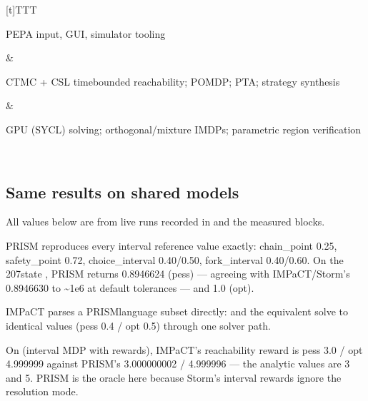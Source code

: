 \documentclass[a4paper,10pt,english]{sphinxmanual}
\begin{document}
\begin{savenotes}
\begin{tabulary}{\linewidth}[t]{TTT}
\\
\sphinxhline\begin{varwidth}[t]{}
\sphinxAtStartPar
PEPA input, GUI, simulator tooling
\sphinxbeforeendvarwidth
\end{varwidth}%
&\begin{varwidth}[t]{}
\sphinxAtStartPar
CTMC + CSL time\sphinxhyphen{}bounded reachability; POMDP; PTA; strategy synthesis
\sphinxbeforeendvarwidth
\end{varwidth}%
&\begin{varwidth}[t]{}
\sphinxAtStartPar
GPU (SYCL) solving; orthogonal/mixture IMDPs; parametric region verification
\sphinxbeforeendvarwidth
\end{varwidth}%
\\
\sphinxbottomrule
\end{tabulary}
\sphinxtableafterendhook\par
\sphinxattableend\end{savenotes}


\subsection{Same results on shared models}
\label{\detokenize{comparison/impact-vs-prism:same-results-on-shared-models}}
\sphinxAtStartPar
All values below are from live runs recorded in  and the
 measured blocks.

\sphinxAtStartPar
{} PRISM reproduces every interval reference value exactly:
chain\_point 0.25, safety\_point 0.72, choice\_interval 0.40/0.50, fork\_interval 0.40/0.60.
On the 207\sphinxhyphen{}state , PRISM returns 0.8946624 (pess) — agreeing with
IMPaCT/Storm’s 0.8946630 to \textasciitilde{}1e\sphinxhyphen{}6 at default tolerances — and 1.0 (opt).

\sphinxAtStartPar
{} IMPaCT parses a PRISM\sphinxhyphen{}language subset directly:
 and the equivalent  solve to identical values
(pess 0.4 / opt 0.5) through one solver path.

\sphinxAtStartPar
{} On  (interval MDP with rewards), IMPaCT’s reachability
reward is pess 3.0 / opt 4.999999 against PRISM’s  3.000000002 / 
4.999996 — the analytic values are 3 and 5. PRISM is the oracle here because Storm’s
interval rewards ignore the resolution mode.
\end{document}
